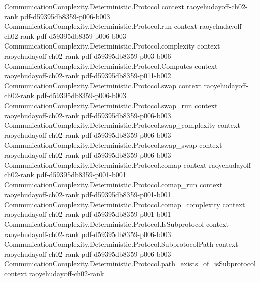 \begin{theorem}
\label{CommunicationComplexity.Deterministic.Rank.clog_boolFunctionRank_le_communicationComplexity}
\leanok
{}
\proofstep
  {CommunicationComplexity.Deterministic.Protocol}
  {context}
  {raoyehudayoff-ch02-rank}
  {pdf-d59395db8359-p006-b003}
\proofstep
  {CommunicationComplexity.Deterministic.Protocol.run}
  {context}
  {raoyehudayoff-ch02-rank}
  {pdf-d59395db8359-p006-b003}
\proofstep
  {CommunicationComplexity.Deterministic.Protocol.complexity}
  {context}
  {raoyehudayoff-ch02-rank}
  {pdf-d59395db8359-p003-b006}
\proofstep
  {CommunicationComplexity.Deterministic.Protocol.Computes}
  {context}
  {raoyehudayoff-ch02-rank}
  {pdf-d59395db8359-p011-b002}
\proofstep
  {CommunicationComplexity.Deterministic.Protocol.swap}
  {context}
  {raoyehudayoff-ch02-rank}
  {pdf-d59395db8359-p006-b003}
\proofstep
  {CommunicationComplexity.Deterministic.Protocol.swap_run}
  {context}
  {raoyehudayoff-ch02-rank}
  {pdf-d59395db8359-p006-b003}
\proofstep
  {CommunicationComplexity.Deterministic.Protocol.swap_complexity}
  {context}
  {raoyehudayoff-ch02-rank}
  {pdf-d59395db8359-p006-b003}
\proofstep
  {CommunicationComplexity.Deterministic.Protocol.swap_swap}
  {context}
  {raoyehudayoff-ch02-rank}
  {pdf-d59395db8359-p006-b003}
\proofstep
  {CommunicationComplexity.Deterministic.Protocol.comap}
  {context}
  {raoyehudayoff-ch02-rank}
  {pdf-d59395db8359-p001-b001}
\proofstep
  {CommunicationComplexity.Deterministic.Protocol.comap_run}
  {context}
  {raoyehudayoff-ch02-rank}
  {pdf-d59395db8359-p001-b001}
\proofstep
  {CommunicationComplexity.Deterministic.Protocol.comap_complexity}
  {context}
  {raoyehudayoff-ch02-rank}
  {pdf-d59395db8359-p001-b001}
\proofstep
  {CommunicationComplexity.Deterministic.Protocol.IsSubprotocol}
  {context}
  {raoyehudayoff-ch02-rank}
  {pdf-d59395db8359-p006-b003}
\proofstep
  {CommunicationComplexity.Deterministic.Protocol.SubprotocolPath}
  {context}
  {raoyehudayoff-ch02-rank}
  {pdf-d59395db8359-p006-b003}
\proofstep
  {CommunicationComplexity.Deterministic.Protocol.path_exists_of_isSubprotocol}
  {context}
  {raoyehudayoff-ch02-rank}

\end{theorem}

